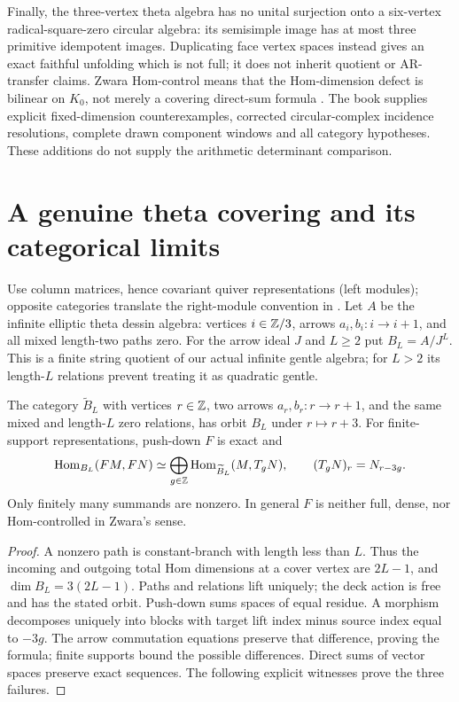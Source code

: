 Finally, the three-vertex theta algebra has no unital surjection onto a six-vertex radical-square-zero circular algebra: its semisimple image has at most three primitive idempotent images. Duplicating face vertex spaces instead gives an exact faithful unfolding which is not full; it does not inherit quotient or AR-transfer claims. Zwara Hom-control means that the Hom-dimension defect is bilinear on $K_0$, not merely a covering direct-sum formula \cite{ZwaraCorrected,RiedtmannZwaraCorrected}. The book supplies explicit fixed-dimension counterexamples, corrected circular-complex incidence resolutions, complete drawn component windows and all category hypotheses. These additions do not supply the arithmetic determinant comparison.



\chapter{A genuine theta covering and its categorical limits}
\label{cover:section}
Use column matrices, hence covariant quiver representations (left modules);
opposite categories translate the right-module convention in
\cite{CoveringLecture2026}. Let $A$ be the infinite elliptic theta dessin
algebra: vertices $i\in\mathbb Z/3$, arrows $a_i,b_i:i\to i+1$, and all mixed
length-two paths zero. For the arrow ideal $J$ and $L\geq2$ put $B_L=A/J^L$.
This is a finite string quotient of our actual infinite gentle algebra;
for $L>2$ its length-$L$ relations prevent treating it as quadratic gentle.

\begin{proposition}\label{cover:hom}
The category $\widetilde B_L$ with vertices $r\in\mathbb Z$, two arrows
$a_r,b_r:r\to r+1$, and the same mixed and length-$L$ zero relations,
has orbit $B_L$ under $r\mapsto r+3$. For finite-support representations,
push-down $F$ is exact and
\[
 \operatorname{Hom}_{B_L}(FM,FN)
 \simeq\bigoplus_{g\in\mathbb Z}
       \operatorname{Hom}_{\widetilde B_L}(M,T_gN),\qquad
 (T_gN)_r=N_{r-3g}.
\]
Only finitely many summands are nonzero. In general $F$ is neither full,
dense, nor Hom-controlled in Zwara's sense.
\end{proposition}
\begin{proof}
A nonzero path is constant-branch with length less than $L$.
Thus the incoming and outgoing total Hom dimensions at a cover vertex are
$2L-1$, and $\dim B_L=3(2L-1)$. Paths and relations lift uniquely; the
deck action is free and has the stated orbit. Push-down sums spaces of equal
residue. A morphism decomposes uniquely into blocks with target lift index
minus source index equal to $-3g$. The arrow commutation equations preserve
that difference, proving the formula; finite supports bound the possible
differences. Direct sums of vector spaces preserve exact sequences.
The following explicit witnesses prove the three failures.
\end{proof}

